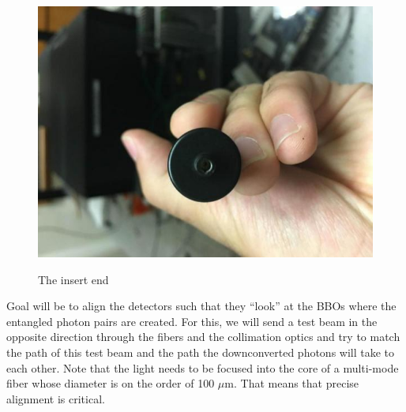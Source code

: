 \documentclass{../lab}
\begin{document}
\begin{figure}[H]
  \href{http://experimentationlab.berkeley.edu/sites/default/files/QIE/insertend_0_1.JPG}{\includegraphics[width=\linewidth,keepaspectratio]{images/insertend_0_1.JPG}}
  \caption{The insert end}
  \label{fig:insertend_0_1.JPG}
\endminipage
\end{figure}

Goal will be to align the detectors such that they ``look'' at the BBOs where the entangled photon pairs are created. For this, we will send a test beam in the opposite direction through the fibers and the collimation optics and try to match the path of this test beam and the path the downconverted photons will take to each other. Note that the light needs to be focused into the core of a multi-mode fiber whose diameter is on the order of 100 $\mu$m. That means that precise alignment is critical.
\end{document}
